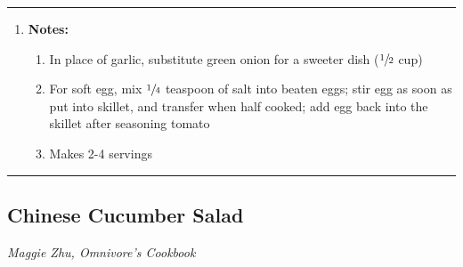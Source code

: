 \documentclass[10pt,a4paper]{article}
\begin{document}
\vskip 0.2in
\rule{\textwidth}{0.4pt}
\begin{enumerate}[]
    \item \textbf{Notes:}
    \begin{enumerate}[-]
        \item In place of garlic, substitute green onion for a sweeter dish ($\sfrac{1}{2}$ cup)
        \item For soft egg, mix $\sfrac{1}{4}$ teaspoon of salt into beaten eggs; stir egg as soon as put into skillet, and transfer when half cooked; add egg back into the skillet after seasoning tomato
        \item Makes 2-4 servings
    \end{enumerate}
\end{enumerate}
\rule{\textwidth}{0.4pt}

\vfill

\subsection{Chinese Cucumber Salad}
\textit{Maggie Zhu, Omnivore's Cookbook}
\end{document}
